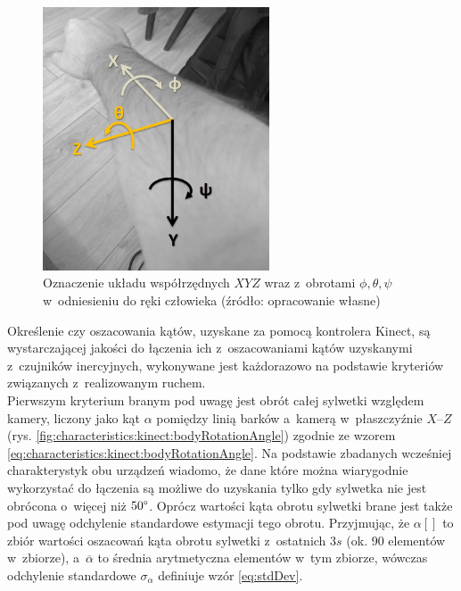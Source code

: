 \begin{savenotes}
	\begin{figure}[!htb]
		\centering	
		\includegraphics[width=0.6\textwidth]{images/handAxes.jpg}	
		\caption{Oznaczenie układu współrzędnych $XYZ$ wraz z~obrotami $\phi , \theta , \psi$ w~odniesieniu do ręki człowieka (źródło: opracowanie własne)}
		\label{fig:handAxes}
	\end{figure}
\end{savenotes}
												
Określenie czy oszacowania kątów, uzyskane za pomocą kontrolera Kinect, są wystarczającej jakości do łączenia ich z~oszacowaniami kątów uzyskanymi z~czujników inercyjnych, wykonywane jest każdorazowo na podstawie kryteriów związanych z~realizowanym ruchem. \\
Pierwszym kryterium branym pod uwagę jest obrót całej sylwetki względem kamery, liczony jako kąt $\alpha$ pomiędzy linią barków a~kamerą w~płaszczyźnie $X$--$Z$ (rys. \ref{fig:characteristics:kinect:bodyRotationAngle}) zgodnie ze wzorem \ref{eq:characteristics:kinect:bodyRotationAngle}. Na podstawie zbadanych wcześniej charakterystyk obu urządzeń wiadomo, że dane które można wiarygodnie wykorzystać do łączenia są możliwe do uzyskania tylko gdy sylwetka nie jest obrócona o~więcej niż $50\degree$. Oprócz wartości kąta obrotu sylwetki brane jest także pod uwagę odchylenie standardowe estymacji tego obrotu. Przyjmując, że $\alpha[]$ to zbiór wartości oszacowań kąta obrotu sylwetki z~ostatnich $3s$ (ok. 90 elementów w~zbiorze), a~$\overline{\alpha}$ to średnia arytmetyczna elementów w~tym zbiorze, wówczas odchylenie standardowe $\sigma_\alpha$ definiuje wzór \ref{eq:stdDev}.
												
